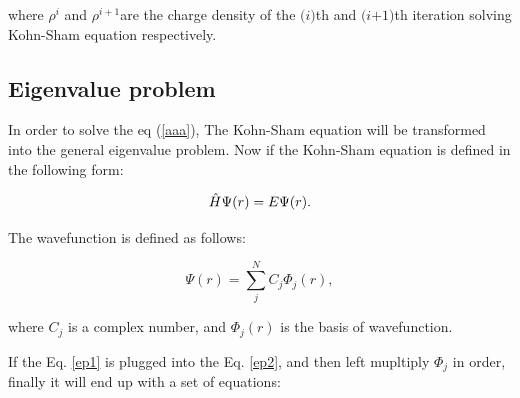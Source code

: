 \documentclass[a4paper, 12pt, titlepage,oneside,drop]{kthesis}
\begin{document}
where $\rho^{i}$ and $\rho^{i+1}$are the charge density of the $\textit{(i)}$th and $\textit {(i+1)}$th iteration solving Kohn-Sham equation respectively.

\vspace{100cm}

\subsection{Eigenvalue problem}

In order to solve the eq (\ref{aaa}), The Kohn-Sham equation will be transformed into the general eigenvalue problem. Now if the Kohn-Sham equation is defined in the following form:

\begin{equation}\label{ep2}
 \hat{H} \Psi (r) = E \Psi (r).
\end{equation}
 

The wavefunction is defined as follows:

\begin{equation}\label{ep1}
 \Psi (r) = \sum\limits_j^N C_j \Phi_j (r),
\end{equation}
 
where $C_j$ is a complex number, and $\Phi_j (r)$ is the basis of wavefunction. 


If the Eq. \ref{ep1} is plugged into the Eq. \ref{ep2}, and then left mupltiply $\Phi_j$ in order, finally it will end up with a set of equations:
\end{document}
